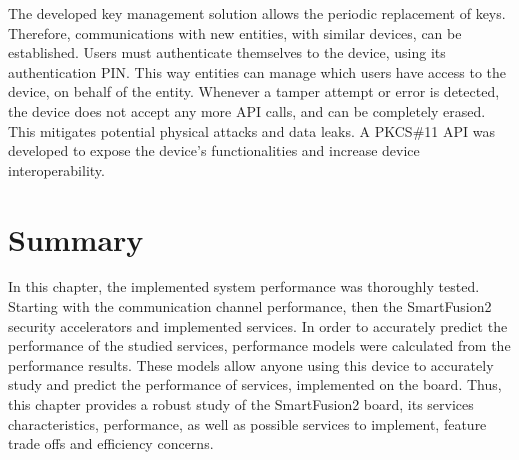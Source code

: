 The developed key management solution allows the periodic replacement of keys. Therefore, communications with new entities, with similar devices, can be established.
Users must authenticate themselves to the device, using its authentication PIN. This way entities can manage which users have access to the device, on behalf of the entity.
Whenever a tamper attempt or error is detected, the device does not accept any more API calls, and can be completely erased. This mitigates potential physical attacks and data leaks.
A PKCS\#11 API was developed to expose the device's functionalities and increase device interoperability.

\section*{Summary}\label{chap:evaluation:summary}

In this chapter, the implemented system performance was thoroughly tested. Starting with the communication channel performance, then the SmartFusion2 security accelerators and implemented services. In order to accurately predict the performance of the studied services, performance models were calculated from the performance results. These models allow anyone using this device to accurately study and predict the performance of services, implemented on the board. Thus, this chapter provides a robust study of the SmartFusion2 board, its services characteristics, performance, as well as possible services to implement, feature trade offs and efficiency concerns.
